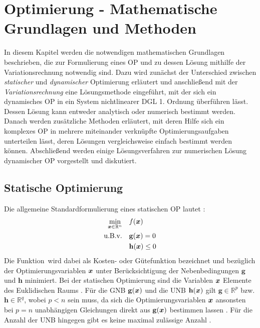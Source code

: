 \chapter{Optimierung - Mathematische Grundlagen und Methoden}\label{cha:Optimierung}
In diesem Kapitel werden die notwendigen mathematischen Grundlagen beschrieben, die zur Formulierung eines \gls{OP} und zu dessen Lösung mithilfe der Variationsrechnung notwendig sind. Dazu wird zunächst der Unterschied zwischen \textit{statischer} und \textit{dynamischer} Optimierung erläutert und anschließend mit der \textit{Variationsrechnung} eine Lösungsmethode eingeführt, mit der sich ein dynamisches \gls{OP} in ein System nichtlinearer \gls{DGL} 1. Ordnung überführen lässt. Dessen Lösung kann entweder analytisch oder numerisch bestimmt werden. Danach werden zusätzliche Methoden erläutert, mit deren Hilfe sich ein komplexes \gls{OP} in mehrere miteinander verknüpfte Optimierungsaufgaben unterteilen lässt, deren Lösungen vergleichsweise einfach bestimmt werden können. Abschließend werden einige Lösungsverfahren zur numerischen Lösung dynamischer \gls{OP} vorgestellt und diskutiert. 
\section{Statische Optimierung}\label{sec:statischeOpt}
Die allgemeine Standardformulierung eines statischen \gls{OP} lautet \cite{KnutGraichen.2012}:
\begin{align}
	\min_{\boldsymbol{x}\in\mathbb{R}^n} \quad &f(\boldsymbol{x}) \label{eq:J_statisch}\\
	\textrm{u.B.v.} \quad&\mathbf{g}(\boldsymbol{x}) = 0 \label{eq:GNB_statisch}\\
	&\mathbf{h}(\boldsymbol{x}) \leq 0 \label{eq:UNB_statisch}
\end{align}
Die Funktion \fofx\,wird dabei als Kosten- oder Gütefunktion bezeichnet und bezüglich der Optimierungsvariablen $\boldsymbol{x}$ unter Berücksichtigung der Nebenbedingungen $\mathbf{g}$ und $\mathbf{h}$ minimiert. Bei der statischen Optimierung sind die Variablen $\boldsymbol{x}$ Elemente des Euklidischen Raums \cite{KnutGraichen.2012}. Für die \gls{GNB} $\mathbf{g}(\boldsymbol{x})$ und die \gls{UNB} $\mathbf{h}(\boldsymbol{x})$ gilt $\mathbf{g}\in\mathbb{R}^p$ bzw. $\mathbf{h}\in\mathbb{R}^q$, wobei $p<n$ sein muss, da sich die Optimierungsvariablen $\boldsymbol{x}$ ansonsten bei $p=n$ unabhängigen Gleichungen direkt aus $\mathbf{g}(\boldsymbol{x})$ bestimmen lassen \cite{Papageorgiou.2012}. Für die Anzahl der \gls{UNB} hingegen gibt es keine maximal zulässige Anzahl \cite{Papageorgiou.2012}.

